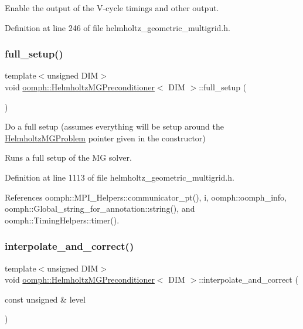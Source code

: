 Enable the output of the V-\/cycle timings and other output. 



Definition at line 246 of file helmholtz\+\_\+geometric\+\_\+multigrid.\+h.

\mbox{\label{classoomph_1_1HelmholtzMGPreconditioner_a5fa312e5c0b1dc263172010c78f3279c}} 
\subsubsection{\texorpdfstring{full\+\_\+setup()}{full\_setup()}}
{\footnotesize\ttfamily template$<$unsigned D\+IM$>$ \\
void \hyperlink{classoomph_1_1HelmholtzMGPreconditioner}{oomph\+::\+Helmholtz\+M\+G\+Preconditioner}$<$ D\+IM $>$\+::full\+\_\+setup (\begin{DoxyParamCaption}{ }\end{DoxyParamCaption})}



Do a full setup (assumes everything will be setup around the \hyperlink{classoomph_1_1HelmholtzMGProblem}{Helmholtz\+M\+G\+Problem} pointer given in the constructor) 

Runs a full setup of the MG solver. 

Definition at line 1113 of file helmholtz\+\_\+geometric\+\_\+multigrid.\+h.



References oomph\+::\+M\+P\+I\+\_\+\+Helpers\+::communicator\+\_\+pt(), i, oomph\+::oomph\+\_\+info, oomph\+::\+Global\+\_\+string\+\_\+for\+\_\+annotation\+::string(), and oomph\+::\+Timing\+Helpers\+::timer().

\mbox{\label{classoomph_1_1HelmholtzMGPreconditioner_a8198021ac078989b3593acf8dbb7f572}} 
\subsubsection{\texorpdfstring{interpolate\+\_\+and\+\_\+correct()}{interpolate\_and\_correct()}}
{\footnotesize\ttfamily template$<$unsigned D\+IM$>$ \\
void \hyperlink{classoomph_1_1HelmholtzMGPreconditioner}{oomph\+::\+Helmholtz\+M\+G\+Preconditioner}$<$ D\+IM $>$\+::interpolate\+\_\+and\+\_\+correct (\begin{DoxyParamCaption}\item[{const unsigned \&}]{level }\end{DoxyParamCaption})}




